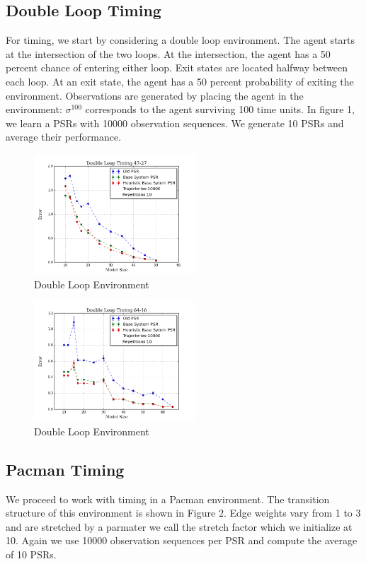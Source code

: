 \subsection{Double Loop Timing}

For timing, we start by considering a double loop environment. The agent starts at the intersection of the two loops. At the intersection, the agent has a 50 percent chance of entering either loop. Exit states are located halfway between each loop. At an exit state, the agent has a 50 percent probability of exiting the environment. Observations are generated by placing the agent in the environment: $\sigma^{100}$ corresponds to the agent surviving 100 time units. In figure 1, we learn a PSRs with 10000 observation sequences. We generate 10 PSRs and average their performance. 

\begin{figure}[ht!]
\centering
\includegraphics[width=60mm]{uCOREPICS/DoubleLoopTimingHeuristics47-27.png}
\caption{Double Loop Environment\label{overflow}}
\end{figure}

\begin{figure}[ht!]
\centering
\includegraphics[width=60mm]{uCOREPICS/DoubleLoop64-16Heuristics.png}
\caption{Double Loop Environment\label{overflow}}
\end{figure}

\subsection{Pacman Timing}

We proceed to work with timing in a Pacman environment. The transition structure of this environment is shown in Figure 2. Edge weights vary from 1 to 3 and are stretched by a parmater we call the stretch factor which we initialize at 10. Again we use 10000 observation sequences per PSR and compute the average of 10 PSRs.

